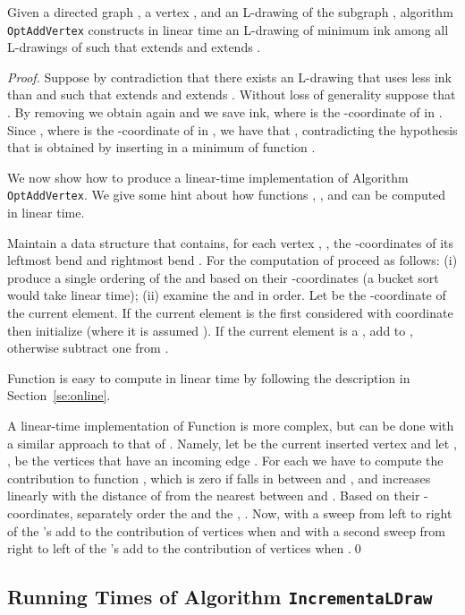 \documentclass{llncs}
\begin{document}
\begin{theorem}\label{th:incremental-optimal}
Given a directed graph , a vertex , and an L-drawing  of the subgraph , algorithm \texttt{OptAddVertex} constructs in linear time an L-drawing  of minimum ink among all L-drawings  of  such that  extends  and  extends .
\end{theorem}
\begin{proof}
Suppose by contradiction that there exists an L-drawing  that uses less ink than  and such that  extends  and  extends . Without loss of generality suppose that . By removing  we obtain again  and we save  ink, where  is the -coordinate of  in . Since , where  is the -coordinate of  in , we have that , contradicting the hypothesis that  is obtained by inserting  in a minimum of function . 

We now show how to produce a linear-time implementation of Algorithm \linebreak \texttt{OptAddVertex}. 
We give some hint about how functions , , and  can be computed in linear time.

Maintain a data structure that contains, for each vertex , , the -coordinates of its leftmost bend  and rightmost bend . For the computation of  proceed as follows: (i) produce a single ordering of the  and  based on their -coordinates (a bucket sort would take linear time); (ii) examine the  and  in order. Let  be the -coordinate of the current element. If the current element is the first considered with coordinate  then initialize  (where it is assumed ). If the current element is a , add  to , otherwise subtract one from .
  
Function  is easy to compute in linear time by following the description in Section~\ref{se:online}. 

A linear-time implementation of Function  is more complex, but can be done with a similar approach to that of . Namely, let  be the current inserted vertex and let , , be the vertices that have an incoming edge . For each  we have to compute the contribution to function , which is zero if  falls in between  and , and increases linearly with the distance of  from the nearest between  and . Based on their -coordinates, separately order the  and the , . Now, with a sweep from left to right of the 's add to  the contribution of vertices  when  and with a second sweep from right to left of the 's add to  the contribution of vertices  when .\qed
\end{proof}

\subsection{Running Times of Algorithm \texttt{IncrementaLDraw}}\label{apx:A4}
\end{document}
